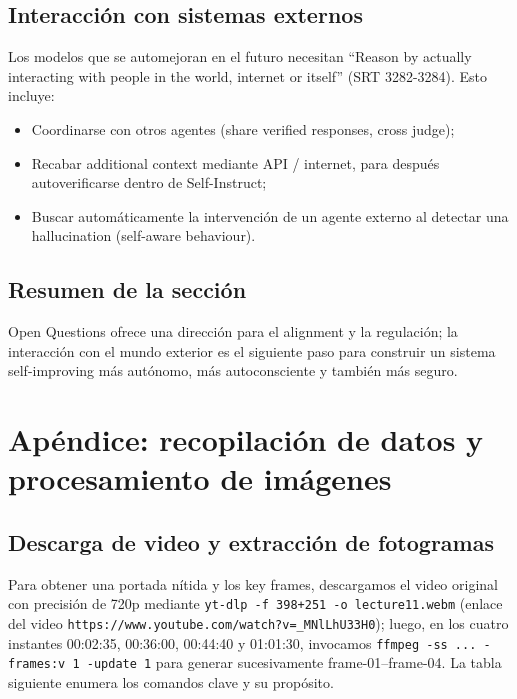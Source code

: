 \documentclass[a4paper]{article}
\begin{document}
\subsection{Interacción con sistemas externos}
Los modelos que se automejoran en el futuro necesitan ``Reason by actually interacting with people in the world, internet or itself'' (SRT 3282-3284). Esto incluye:
\begin{itemize}
    \item Coordinarse con otros agentes (share verified responses, cross judge);
    \item Recabar additional context mediante API / internet, para después autoverificarse dentro de Self-Instruct;
    \item Buscar automáticamente la intervención de un agente externo al detectar una hallucination (self-aware behaviour).
\end{itemize}

\subsection{Resumen de la sección}
Open Questions ofrece una dirección para el alignment y la regulación; la interacción con el mundo exterior es el siguiente paso para construir un sistema self-improving más autónomo, más autoconsciente y también más seguro.

\section{Apéndice: recopilación de datos y procesamiento de imágenes}
\subsection{Descarga de video y extracción de fotogramas}
Para obtener una portada nítida y los key frames, descargamos el video original con precisión de 720p mediante \texttt{yt-dlp -f 398+251 -o lecture11.webm} (enlace del video \texttt{https://www.youtube.com/watch?v=\_MNlLhU33H0}); luego, en los cuatro instantes 00:02:35, 00:36:00, 00:44:40 y 01:01:30, invocamos \texttt{ffmpeg -ss ... -frames:v 1 -update 1} para generar sucesivamente frame-01–frame-04. La tabla siguiente enumera los comandos clave y su propósito.
\end{document}
